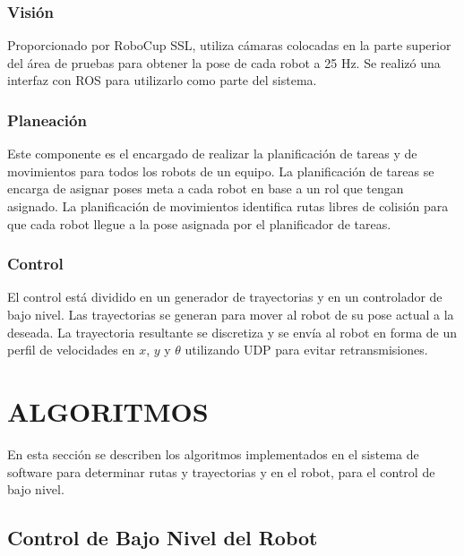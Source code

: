 \documentclass[twocolumn,10pt]{amrob}
\begin{document}
\subsubsection*{Visión}
\label{subsec:vision}
Proporcionado por RoboCup SSL, utiliza cámaras colocadas en la parte superior del área de pruebas para obtener la pose de cada robot a 25 Hz. Se realizó una interfaz con ROS para utilizarlo como parte del sistema.

\subsubsection*{Planeación}
\label{subsec:Planificacion}
Este componente es el encargado de realizar la planificación de tareas y de movimientos para todos los robots de un equipo. La planificación de tareas se encarga de asignar poses meta a cada robot en base a un rol que tengan asignado. La planificación de movimientos identifica rutas libres de colisión para que cada robot llegue a la pose asignada por el planificador de tareas.
\subsubsection*{Control}
\label{subsec:Ctrl}
El control está dividido en un generador de trayectorias y en un controlador de bajo nivel. Las trayectorias se generan para mover al robot de su pose actual a la deseada. La trayectoria resultante se discretiza y se envía al robot en forma de un perfil de velocidades en $x$, $y$ y $\theta$ utilizando UDP para evitar retransmisiones.
 


\section*{ALGORITMOS}
\label{sec:algoritmos}
En esta sección se describen los algoritmos implementados en el sistema de software para determinar rutas y trayectorias y en el robot, para el control de bajo nivel.

\subsection*{Control de Bajo Nivel del Robot}
\end{document}
